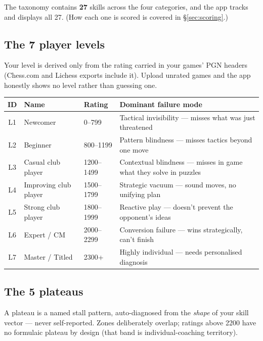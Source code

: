 \documentclass[11pt]{article}
\begin{document}
\begin{notebox}
The taxonomy contains \textbf{27} skills across the four categories, and the app
tracks and displays all 27. (How each one is scored is covered in
\S\ref{sec:scoring}.)
\end{notebox}

\subsection{The 7 player levels}

Your level is derived only from the rating carried in your games' PGN headers
(Chess.com and Lichess exports include it). Upload unrated games and the app
honestly shows no level rather than guessing one.

\begin{center}
\tabnum
\begin{tabularx}{\linewidth}{@{}c l l Y@{}}
\toprule
\textbf{ID} & \textbf{Name} & \textbf{Rating} & \textbf{Dominant failure mode} \\
\midrule
L1 & Newcomer & 0--799 & Tactical invisibility --- misses what was just threatened \\
L2 & Beginner & 800--1199 & Pattern blindness --- misses tactics beyond one move \\
L3 & Casual club player & 1200--1499 & Contextual blindness --- misses in game what they solve in puzzles \\
L4 & Improving club player & 1500--1799 & Strategic vacuum --- sound moves, no unifying plan \\
L5 & Strong club player & 1800--1999 & Reactive play --- doesn't prevent the opponent's ideas \\
L6 & Expert / CM & 2000--2299 & Conversion failure --- wins strategically, can't finish \\
L7 & Master / Titled & 2300+ & Highly individual --- needs personalised diagnosis \\
\bottomrule
\end{tabularx}
\end{center}

\subsection{The 5 plateaus}

A plateau is a named stall pattern, auto-diagnosed from the \emph{shape} of your
skill vector --- never self-reported. Zones deliberately overlap; ratings above
2200 have no formulaic plateau by design (that band is individual-coaching
territory).
\end{document}
